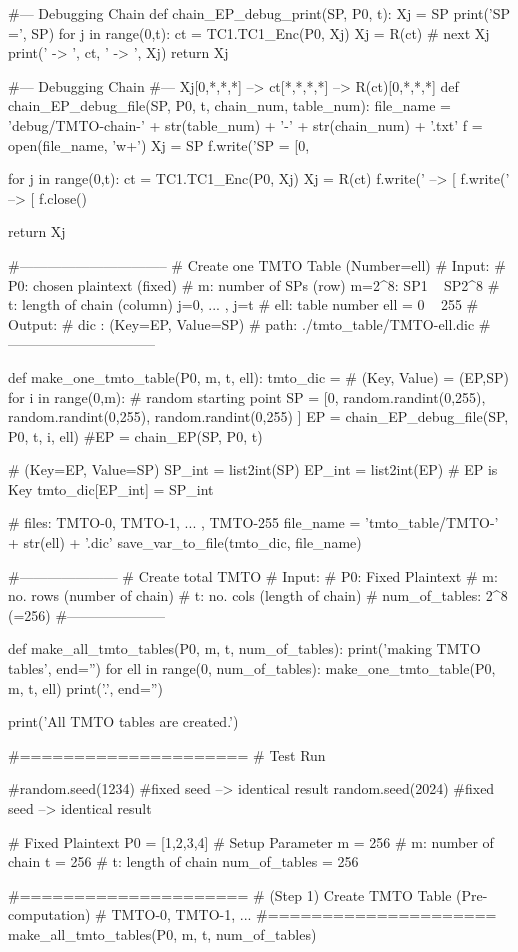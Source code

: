 \begin{python}
#--- Debugging Chain
def chain_EP_debug_print(SP, P0, t):
   Xj = SP
   print('SP =', SP)
   for j in range(0,t):
      ct = TC1.TC1_Enc(P0, Xj)
      Xj = R(ct)   # next Xj 
      print(' -> ', ct, ' -> ', Xj)
   return Xj

#--- Debugging Chain
#--- Xj[0,*,*,*] --> ct[*,*,*,*] --> R(ct)[0,*,*,*]
def chain_EP_debug_file(SP, P0, t, chain_num, table_num):
   file_name = 'debug/TMTO-chain-' + str(table_num) + '-' + str(chain_num) + '.txt'
   f = open(file_name, 'w+')
   Xj = SP
   f.write('SP = [0, %

   for j in range(0,t):
      ct = TC1.TC1_Enc(P0, Xj)
      Xj = R(ct)
      f.write(' --> [%
      f.write(' --> [%
   f.close()

   return Xj

#--------------------------------
# Create one TMTO Table (Number=ell)
# Input:
#      P0: chosen plaintext (fixed)
#       m: number of SPs (row)        m=2^8: SP1 ~ SP2^8
#       t: length of chain (column)   j=0, ... , j=t
#     ell: table number               ell = 0 ~ 255
# Output: 
#    dic : { (Key=EP, Value=SP) }    
#    path: ./tmto_table/TMTO-ell.dic
#--------------------------------

def make_one_tmto_table(P0, m, t, ell):
   tmto_dic = {}  # (Key, Value) = (EP,SP)
   for i in range(0,m):
      # random starting point
      SP = [0, random.randint(0,255), random.randint(0,255), random.randint(0,255) ]
      EP = chain_EP_debug_file(SP, P0, t, i, ell)
      #EP = chain_EP(SP, P0, t)  

      # { (Key=EP, Value=SP) }
      SP_int = list2int(SP)
      EP_int = list2int(EP)
      # EP is Key
      tmto_dic[EP_int] = SP_int

   # files: TMTO-0, TMTO-1, ... , TMTO-255
   file_name = 'tmto_table/TMTO-' + str(ell) + '.dic'
   save_var_to_file(tmto_dic, file_name)

#---------------------
# Create total TMTO
# Input:
#   P0: Fixed Plaintext 
#   m: no. rows (number of chain)
#   t: no. cols (length of chain)
#   num_of_tables: 2^8 (=256)
#---------------------
   
def make_all_tmto_tables(P0, m, t, num_of_tables):
   print('making TMTO tables', end='')
   for ell in range(0, num_of_tables):
      make_one_tmto_table(P0, m, t, ell)
      print('.', end='')

   print('\n All TMTO tables are created.')

#=====================
# Test Run

#random.seed(1234)  #fixed seed --> identical result
random.seed(2024)  #fixed seed --> identical result

# Fixed Plaintext
P0 = [1,2,3,4]
# Setup Parameter
m = 256             # m: number of chain
t = 256             # t: length of chain
num_of_tables = 256

#=====================
# (Step 1) Create TMTO Table (Pre-computation)
# TMTO-0, TMTO-1, ...
#=====================
make_all_tmto_tables(P0, m, t, num_of_tables)
\end{python}



